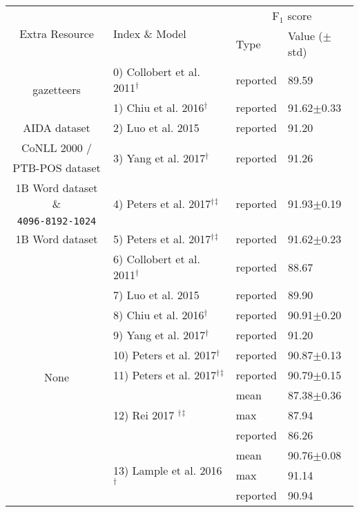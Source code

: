 \documentclass[letterpaper]{article} \usepackage{aaai18}  \usepackage{times}  \usepackage{helvet}  \usepackage{courier}  \usepackage{url}  \usepackage{graphicx}  \usepackage{multirow}
\begin{document}
\begin{table}[t!]
\center
\scalebox{0.7}
{
\begin{tabular}{c||l|l|l}
\hline
\multirow{2}{*}{Extra Resource} & \multirow{2}{*}{Index \& Model} & \multicolumn{2}{|c}{F$_1$ score}\\
\cline{3-4}
 & & Type & Value ($\pm$std)\\
\hline
\hline
\multirow{2}{*}{gazetteers} & 0) Collobert et al. 2011$^\dagger$ & reported& 89.59 \\
\cline{2-4}
& 1) Chiu et al. 2016$^\dagger$ & reported & 91.62$\pm$0.33 \\
\hline
AIDA dataset & 2) Luo et al. 2015 & reported& 91.20 \\
\hline
CoNLL 2000 / & \multirow{2}{*}{3) Yang et al. 2017$^\dagger$} & \multirow{2}{*}{reported} & \multirow{2}{*}{91.26} \\
PTB-POS dataset & & & \\
\hline
1B Word dataset \& & \multirow{2}{*}{4) Peters et al. 2017$^\dagger$$^\ddagger$ } & \multirow{2}{*}{reported} & \multirow{2}{*}{91.93$\pm$0.19} \\
\texttt{4096-8192-1024} & & & \\
\hline
1B Word dataset & 5) Peters et al. 2017$^\dagger$$^\ddagger$ & reported & 91.62$\pm$0.23 \\
\hline
\multirow{15}{*}{None} & 6) Collobert et al. 2011$^\dagger$ & reported& 88.67 \\
\cline{2-4}
& 7) Luo et al. 2015 & reported& 89.90 \\
\cline{2-4}
& 8) Chiu et al. 2016$^\dagger$ & reported & 90.91$\pm$0.20 \\
\cline{2-4}
& 9) Yang et al. 2017$^\dagger$ & reported & 91.20\\
\cline{2-4}
& 10) Peters et al. 2017$^\dagger$ & reported & 90.87$\pm$0.13\\
\cline{2-4}
& 11) Peters et al. 2017$^\dagger$$^\ddagger$ & reported & 90.79$\pm$0.15\\
\cline{2-4}
& \multirow{3}{*}{ 12) Rei 2017 $^\dagger$$^\ddagger$ } & mean & 87.38$\pm$0.36\\
\cline{3-4}
& & max & 87.94\\
\cline{3-4}
& & reported & 86.26\\
\cline{2-4}
& \multirow{3}{*}{13) Lample et al. 2016$^\dagger$} & mean & 90.76$\pm$0.08\\
\cline{3-4}
& & max & 91.14\\
\cline{3-4}
& & reported & 90.94\\

\end{tabular}}
\end{table}
\end{document}
